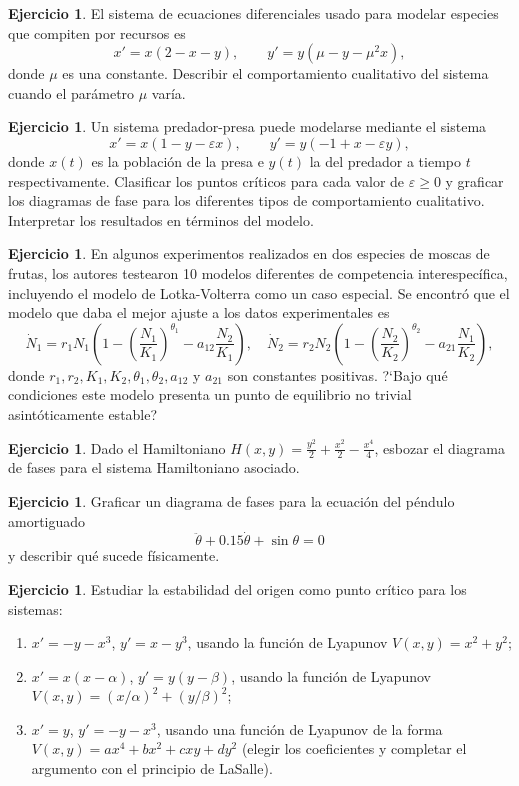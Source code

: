 \documentclass[12pt, a4paper]{amsbook}
\newcommand{\ve}{\varepsilon}
\theoremstyle{remark}
\theoremstyle{definition}
\newtheorem{ejer}[teo]{Ejercicio}
\numberwithin{section}{chapter}
\numberwithin{subsection}{section}
\numberwithin{equation}{section}
\numberwithin{figure}{chapter}
\begin{document}
\begin{ejer}
El sistema de ecuaciones diferenciales usado para modelar especies que compiten por recursos es
$$
x' = x(2 - x - y),\qquad  y' = y(\mu - y - \mu^2x),
$$
donde $\mu$ es una constante. Describir el comportamiento cualitativo del sistema cuando el parámetro $\mu$ varía.
\end{ejer}


\begin{ejer}
Un sistema predador-presa puede modelarse mediante el sistema
$$
x' = x(1 - y - \varepsilon x),\qquad  y' = y(-1 + x - \varepsilon y),
$$
donde $x(t)$ es la población de la presa e $y(t)$ la del predador a tiempo $t$ respectivamente. Clasificar los puntos críticos para cada valor de $\ve\ge 0$ y graficar los diagramas de fase para los diferentes tipos de comportamiento cualitativo. Interpretar los resultados en términos del modelo.
\end{ejer}

\begin{ejer}
En algunos experimentos realizados en dos especies de moscas de frutas, los autores testearon 10 modelos diferentes de competencia interespecífica, incluyendo el modelo de Lotka-Volterra como un caso especial. Se encontró que el modelo que daba el mejor ajuste a los datos experimentales es 
$$
\dot N_1 = r_1 N_1 \left(1 - \left(\frac{N_1}{K_1}\right)^{\theta_1} - a_{12}\frac{N_2}{K_1}\right),\quad \dot N_2 = r_2 N_2 \left(1 - \left(\frac{N_2}{K_2}\right)^{\theta_2} - a_{21}\frac{N_1}{K_2}\right),
$$
donde $r_1, r_2, K_1, K_2, \theta_1, \theta_2, a_{12}$ y $a_{21}$ son constantes positivas. ?`Bajo qué condiciones este modelo presenta un punto de equilibrio no trivial asintóticamente estable?
\end{ejer}

\begin{ejer}
Dado el Hamiltoniano $H(x, y) = \frac{y^2}{2} +\frac{x^2}{2} - \frac{x^4}{4}$, esbozar el diagrama de fases para el sistema Hamiltoniano asociado.
\end{ejer}

\begin{ejer}
Graficar un diagrama de fases para la ecuación del péndulo amortiguado
$$
\ddot \theta + 0.15 \dot\theta + \sin\theta = 0
$$
y describir qué sucede físicamente.
\end{ejer}

\begin{ejer}
Estudiar la estabilidad del origen como punto crítico para los sistemas:
\begin{enumerate}
\item $x' = -y - x^3$, $y' = x - y^3$, usando la función de Lyapunov $V(x, y) = x^2 + y^2$;
\item $x' = x(x - \alpha)$, $y' = y(y - \beta)$, usando la función de Lyapunov $V(x, y) =(x/\alpha)^2 + (y/\beta)^2$;
\item $x' = y$, $y' = -y - x^3$, usando una función de Lyapunov de la forma $V(x, y) = a x^4 + b x^2 + c xy + d y^2$ (elegir los coeficientes y completar el argumento con el principio de LaSalle).
\end{enumerate}
\end{ejer}
\end{document}
